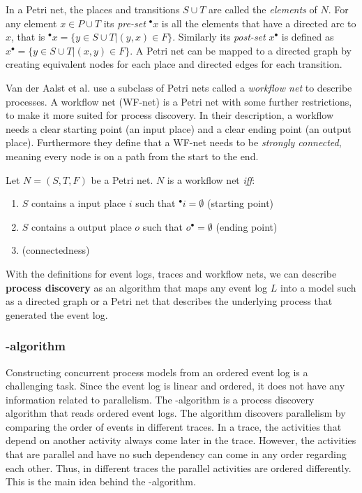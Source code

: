 In a Petri net, the places and transitions $S \cup T$ are called the \emph{elements} of $N$.
For any element $x \in P \cup T$ its \emph{pre-set} ${}^\bullet x$ is all the elements that have a directed arc to $x$, that is ${}^\bullet x = \{y \in S \cup T | (y,x) \in F\}$. Similarly its \emph{post-set} $x^\bullet$ is defined as 
$x^\bullet = \{y \in S \cup T | (x,y) \in F\}$.
A Petri net can be mapped to a directed graph by creating equivalent nodes for each place and directed edges for each transition.

Van der Aalst et al. \cite{van2013discovering} use a subclass of Petri nets called a \emph{workflow net} to describe processes. A workflow net (WF-net) is a Petri net with some further restrictions, to make it more suited for process discovery. In their description, a workflow needs a clear starting point (an input place) and a clear ending point (an output place). Furthermore they define that a WF-net needs to be \emph{strongly connected}, meaning every node is on a path from the start to the end.

\begin{definition}
Let $N = (S, T, F)$ be a Petri net. $N$ is a workflow net \emph{iff}:
\begin{enumerate}
    \item $S$ contains a input place $i$ such that ${}^\bullet i = \emptyset$ (starting point)
    \item $S$ contains a output place $o$ such that $o^\bullet = \emptyset$ (ending point)
    \item {} (connectedness)
\end{enumerate}
\end{definition}

With the definitions for event logs, traces and workflow nets, we can describe \textbf{process discovery} as an algorithm that maps any event log $L$ into a model such as a directed graph or a Petri net that describes the underlying process that generated the event log.

\subsubsection{\textalpha-algorithm}
\label{sec:alphaalgorithm}

Constructing concurrent process models from an ordered event log is a challenging task.
Since the event log is linear and ordered, it does not have any information related to parallelism.
The \textalpha-algorithm is a process discovery algorithm that reads ordered event logs.
The algorithm discovers parallelism by comparing the order of events in different traces.
In a trace, the activities that depend on another activity always come later in the trace.
However, the activities that are parallel and have no such dependency can come in any order regarding each other.
Thus, in different traces the parallel activities are ordered differently. 
This is the main idea behind the \textalpha-algorithm.

